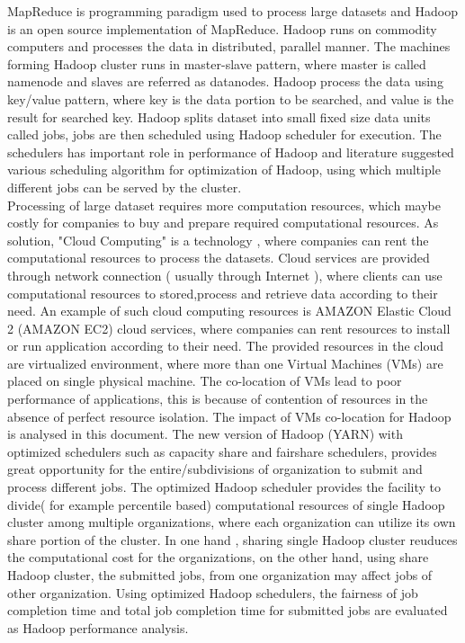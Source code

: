 MapReduce is programming paradigm used to process large datasets and Hadoop is an open source implementation of MapReduce. Hadoop runs on commodity computers and processes the data in distributed, parallel manner. The machines forming Hadoop cluster runs in master-slave pattern, where master is called namenode and slaves are referred as datanodes. Hadoop process the data using key/value pattern, where key is the data portion to be searched, and value is the result for searched key. Hadoop splits dataset into small fixed size data units called jobs, jobs are then scheduled using Hadoop scheduler for execution. The schedulers has important role in performance of Hadoop and literature suggested various scheduling algorithm for optimization of Hadoop, using which multiple different jobs can be served by the cluster. \\
 

Processing of large dataset requires more computation resources, which maybe costly for companies to buy and prepare required computational resources. As solution,  "Cloud Computing" is a technology , where companies can rent the computational resources to process the datasets. Cloud services are provided through network connection ( usually through Internet ), where clients can use computational resources to stored,process and retrieve data according to their need. An example of such cloud computing resources is AMAZON Elastic Cloud 2 (AMAZON EC2) cloud services, where companies can rent resources to install or run application according to their need. The provided resources in the cloud are virtualized environment, where more than one Virtual Machines (VMs) are placed on single physical machine. The co-location of VMs lead to poor performance of applications, this is because of contention of resources in the absence of perfect resource isolation.  The impact of VMs co-location for Hadoop is analysed in this document. The new version of Hadoop (YARN) with optimized schedulers such as capacity share and fairshare schedulers, provides great opportunity for the entire/subdivisions of organization to submit and process different jobs. The optimized Hadoop scheduler provides the facility to divide( for example percentile based) computational resources of single Hadoop cluster among multiple organizations, where each organization can utilize its own share portion of the cluster. In one hand , sharing single Hadoop cluster reuduces the computational cost for the organizations, on the other hand, using share Hadoop cluster, the submitted jobs, from one organization may affect jobs of other organization. Using optimized Hadoop schedulers, the fairness of job completion time and total job completion time for submitted jobs are evaluated as Hadoop performance analysis.\\


